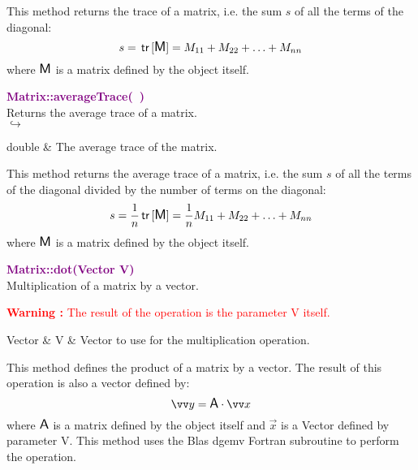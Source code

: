 This method returns the trace of a matrix, i.e. the sum $s$ of all the terms of the diagonal:
\begin{equation*}
s = \mbox{\ensuremath{\mathsf{\,tr\,}}}[\mbox{\large\ensuremath{\mathsf{M}}}] = M_{11}+M_{22}+\hdots+M_{nn}
\end{equation*}
where $\mbox{\large\ensuremath{\mathsf{M}}}$ is a matrix defined by the object itself.

\textcolor{purple}{\textbf{Matrix::averageTrace(~)}}\label{Matrix::averageTrace()}\\
Returns the average trace of a matrix.\\ \hspace*{5mm}$\hookrightarrow$
\vspace*{-2em}\begin{tcolorbox}[grow to left by=-1cm, width=\textwidth-1cm,myArgs,tabularx={l|R}]
double & The average trace of the matrix.
\end{tcolorbox}

This method returns the average trace of a matrix, i.e. the sum $s$ of all the terms of the diagonal divided by the number of terms on the diagonal:
\begin{equation*}
s = \frac{1}{n} \mbox{\ensuremath{\mathsf{\,tr\,}}}[\mbox{\large\ensuremath{\mathsf{M}}}] = \frac{1}{n} M_{11}+M_{22}+\hdots+M_{nn}
\end{equation*}
where $\mbox{\large\ensuremath{\mathsf{M}}}$ is a matrix defined by the object itself.

\textcolor{purple}{\textbf{Matrix::dot(Vector V)}}\label{Matrix::dot(Vector V)}\\
Multiplication of a matrix by a vector.

\hspace*{10mm}\textcolor{red}{\textbf{Warning :}  The result of the operation is the parameter V itself.}

\begin{tcolorbox}[width=\textwidth,myArgs,tabularx={ll|R}]
Vector & V & Vector to use for the multiplication operation.
\end{tcolorbox}

This method defines the product of a matrix by a vector.
The result of this operation is also a vector defined by:
\begin{equation*}
\overrightarrow{y} = \A \cdot \overrightarrow{x}
\end{equation*}
where $\mbox{\large\ensuremath{\mathsf{A}}}$ is a matrix defined by the object itself and $\overrightarrow{x}$ is a Vector defined by parameter V.
This method uses the Blas \textsf{dgemv} Fortran subroutine to perform the operation.

